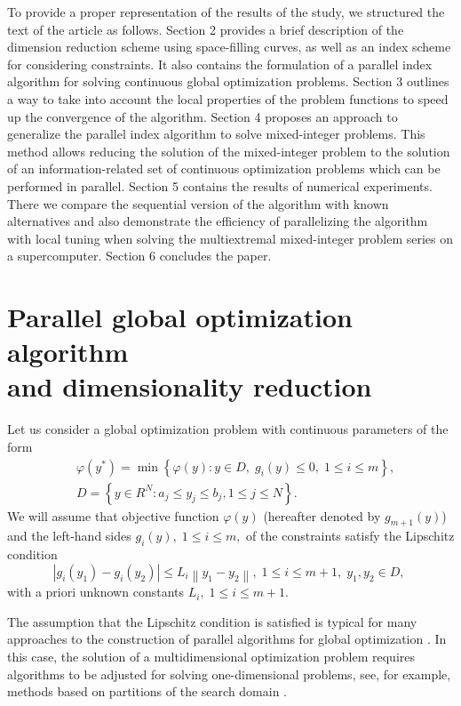 \documentclass[
11pt,%
tightenlines,%
twoside,%
onecolumn,%
nofloats,%
nobibnotes,%
nofootinbib,%
superscriptaddress,%
noshowpacs,%
centertags]%
{revtex4}
\begin{document}
To provide a proper representation of the results of the study, we structured the text of the article as follows.
Section 2 provides a brief description of the dimension reduction scheme using space-filling curves, as well as an index scheme for considering constraints. It also contains the formulation of a parallel index algorithm for solving continuous global optimization problems.
Section 3 outlines a way to take into account the local properties of the problem functions to speed up the convergence of the algorithm.
Section 4 proposes an approach to generalize the parallel index algorithm to solve mixed-integer problems. This method allows reducing the solution of the mixed-integer problem to the solution of an information-related set of continuous optimization problems which can be performed in parallel.
Section 5 contains the results of numerical experiments. There we compare the sequential version of the algorithm with known alternatives and also demonstrate the efficiency of parallelizing the algorithm with local tuning when solving the multiextremal mixed-integer problem series on a supercomputer. 
Section 6 concludes the paper.

\section{Parallel global optimization algorithm\protect\\
and dimensionality reduction}

Let us consider a global optimization problem with continuous parameters of the form
\begin{eqnarray}\label{problem}
&\varphi(y^\ast)=\min{\left\{\varphi(y):y\in D, \; g_i(y)\leq 0, \; 1 \leq i \leq m\right\}},\\
&D=\left\{y\in R^N: a_j\leq y_j \leq b_j, 1\leq j \leq N \right\}.\label{D}
\end{eqnarray}
We will assume that objective function $\varphi(y)$ (hereafter denoted by $g_{m+1}(y)$) and the left-hand sides $g_i(y), \; 1\leq i \leq m,$ of the constraints satisfy the Lipschitz condition 
\[
\left|g_i(y_1)-g_i(y_2)\right|\leq L_i\left\|y_1-y_2\right\|, \;1\leq i\leq m+1, \; y_1,y_2 \in D,\;
\]
with a priori unknown constants $L_i, \; 1 \leq i \leq m+1$. 

The assumption that the Lipschitz condition is satisfied is typical for many approaches to the construction of parallel algorithms for global optimization \cite{Evtushenko2009,Zilinskas2011}. In this case, the solution of a multidimensional optimization problem requires algorithms to be adjusted for solving one-dimensional problems, see, for example, methods based on partitions of the search domain \cite{Zilinskas2014,Sergeyev2017}.
\end{document}
